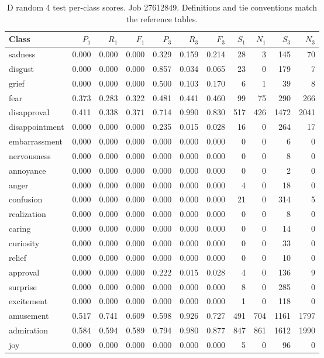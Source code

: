\begin{table}[!htbp]
\centering
\scriptsize
\setlength{\tabcolsep}{5pt}
\begin{tabular}{lrrrrrrrrrr}
\toprule
Class & $P_1$ & $R_1$ & $F_1$ & $P_3$ & $R_3$ & $F_3$ & $S_1$ & $N_1$ & $S_3$ & $N_3$ \\
\midrule
sadness & 0.000 & 0.000 & 0.000 & 0.329 & 0.159 & 0.214 & 28 & 3 & 145 & 70 \\
disgust & 0.000 & 0.000 & 0.000 & 0.857 & 0.034 & 0.065 & 23 & 0 & 179 & 7 \\
grief & 0.000 & 0.000 & 0.000 & 0.500 & 0.103 & 0.170 & 6 & 1 & 39 & 8 \\
fear & 0.373 & 0.283 & 0.322 & 0.481 & 0.441 & 0.460 & 99 & 75 & 290 & 266 \\
disapproval & 0.411 & 0.338 & 0.371 & 0.714 & 0.990 & 0.830 & 517 & 426 & 1472 & 2041 \\
disappointment & 0.000 & 0.000 & 0.000 & 0.235 & 0.015 & 0.028 & 16 & 0 & 264 & 17 \\
embarrassment & 0.000 & 0.000 & 0.000 & 0.000 & 0.000 & 0.000 & 0 & 0 & 6 & 0 \\
nervousness & 0.000 & 0.000 & 0.000 & 0.000 & 0.000 & 0.000 & 0 & 0 & 8 & 0 \\
annoyance & 0.000 & 0.000 & 0.000 & 0.000 & 0.000 & 0.000 & 0 & 0 & 2 & 0 \\
anger & 0.000 & 0.000 & 0.000 & 0.000 & 0.000 & 0.000 & 4 & 0 & 18 & 0 \\
confusion & 0.000 & 0.000 & 0.000 & 0.000 & 0.000 & 0.000 & 21 & 0 & 314 & 5 \\
realization & 0.000 & 0.000 & 0.000 & 0.000 & 0.000 & 0.000 & 0 & 0 & 8 & 0 \\
caring & 0.000 & 0.000 & 0.000 & 0.000 & 0.000 & 0.000 & 0 & 0 & 14 & 0 \\
curiosity & 0.000 & 0.000 & 0.000 & 0.000 & 0.000 & 0.000 & 0 & 0 & 33 & 0 \\
relief & 0.000 & 0.000 & 0.000 & 0.000 & 0.000 & 0.000 & 0 & 0 & 10 & 0 \\
approval & 0.000 & 0.000 & 0.000 & 0.222 & 0.015 & 0.028 & 4 & 0 & 136 & 9 \\
surprise & 0.000 & 0.000 & 0.000 & 0.000 & 0.000 & 0.000 & 8 & 0 & 285 & 0 \\
excitement & 0.000 & 0.000 & 0.000 & 0.000 & 0.000 & 0.000 & 1 & 0 & 118 & 0 \\
amusement & 0.517 & 0.741 & 0.609 & 0.598 & 0.926 & 0.727 & 491 & 704 & 1161 & 1797 \\
admiration & 0.584 & 0.594 & 0.589 & 0.794 & 0.980 & 0.877 & 847 & 861 & 1612 & 1990 \\
joy & 0.000 & 0.000 & 0.000 & 0.000 & 0.000 & 0.000 & 5 & 0 & 96 & 0 \\
\bottomrule
\end{tabular}
\caption{D random 4 test per-class scores. Job 27612849. Definitions and tie conventions match the reference tables.}
\label{tab:classes-d_random_k4}
\end{table}
